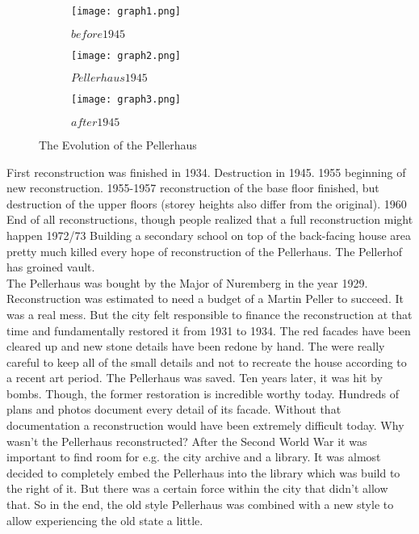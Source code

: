 \begin{figure}[h]
	\centering
	\begin{subfigure}[b]{0.3\textwidth}
		\centering
		\texttt{[image: graph1.png]}
		\caption{$before 1945$}
		\label{fig:pellerhaus_historic}
	\end{subfigure}
	\hfill
	\begin{subfigure}[b]{0.3\textwidth}
		\centering
		\texttt{[image: graph2.png]}
		\caption{$Pellerhaus 1945$}
		\label{fig:pellerhaus_destructed}
	\end{subfigure}
	\hfill
	\begin{subfigure}[b]{0.3\textwidth}
		\centering
		\texttt{[image: graph3.png]}
		\caption{$after 1945$}
		\label{fig:pellerhaus_modern}
	\end{subfigure}
	\caption{The Evolution of the Pellerhaus}
	\label{fig:pellerhaus_states}
\end{figure}

First reconstruction was finished in 1934.
Destruction in 1945.
1955 beginning of new reconstruction.
1955-1957 reconstruction of the base floor finished, but destruction of the upper floors (storey heights also differ from the original).
1960 End of all reconstructions, though people realized that a full reconstruction might happen
1972/73 Building a secondary school on top of the back-facing house area pretty much killed every hope of reconstruction of the Pellerhaus.
The Pellerhof has groined vault.\parencite{afPellerhausMagazin01} \\

The Pellerhaus was bought by the Major of Nuremberg in the year 1929. Reconstruction was estimated to need a budget of a Martin Peller to succeed. It was a real mess. But the city felt responsible to finance the reconstruction at that time and fundamentally restored it from 1931 to 1934. The red facades have been cleared up and new stone details have been redone by hand. The were really careful to keep all of the small details and not to recreate the house according to a recent art period. The Pellerhaus was saved. Ten years later, it was hit by bombs. Though, the former restoration is incredible worthy today. Hundreds of plans and photos document every detail of its facade. Without that documentation a reconstruction would have been extremely difficult today.
Why wasn't the Pellerhaus reconstructed?
After the Second World War it was important to find room for e.g. the city archive and a library. It was almost decided to completely embed the Pellerhaus into the library which was build to the right of it. But there was a certain force within the city that didn't allow that. So in the end, the old style Pellerhaus was combined with a new style to allow experiencing the old state a little.\parencite{afPellerhausMagazin02} \\

